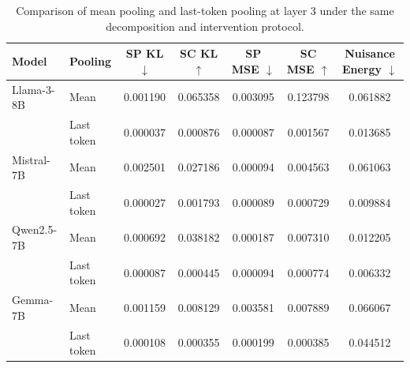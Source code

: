 \begin{table}[t]
\centering
\small
\setlength{\tabcolsep}{4pt}
\renewcommand{\arraystretch}{1.15}
\caption{Comparison of mean pooling and last-token pooling at
layer 3 under the same decomposition and intervention protocol.}
\label{tab:pooling_comparison}
\begin{tabular}{llccccc}
\toprule
Model & Pooling
& SP KL $\downarrow$
& SC KL $\uparrow$
& SP MSE $\downarrow$
& SC MSE $\uparrow$
& Nuisance Energy $\downarrow$ \\
\midrule
Llama-3-8B & Mean
& 0.001190 & 0.065358 & 0.003095 & 0.123798 & 0.061882 \\
& Last token
& 0.000037 & 0.000876 & 0.000087 & 0.001567 & 0.013685 \\
\midrule
Mistral-7B & Mean
& 0.002501 & 0.027186 & 0.000094 & 0.004563 & 0.061063 \\
& Last token
& 0.000027 & 0.001793 & 0.000089 & 0.000729 & 0.009884 \\
\midrule
Qwen2.5-7B & Mean
& 0.000692 & 0.038182 & 0.000187 & 0.007310 & 0.012205 \\
& Last token
& 0.000087 & 0.000445 & 0.000094 & 0.000774 & 0.006332 \\
\midrule
Gemma-7B & Mean
& 0.001159 & 0.008129 & 0.003581 & 0.007889 & 0.066067 \\
& Last token
& 0.000108 & 0.000355 & 0.000199 & 0.000385 & 0.044512 \\
\bottomrule
\end{tabular}
\end{table}